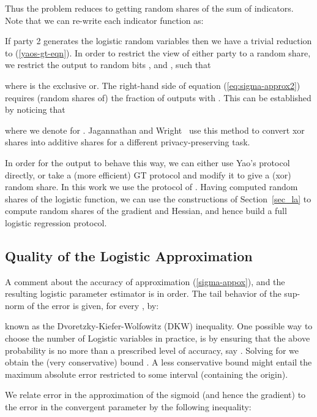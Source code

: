 \documentclass[11pt]{article}
\begin{document}
Thus the problem reduces to getting random shares of the sum of indicators.   Note that we can re-write each indicator function as:


\noindent If party 2 generates the logistic random variables then we have a trivial reduction to (\ref{yaos-gt-eqn}).  In order to restrict the view of either party to a random share, we restrict the output to random bits , and , such that

where  is the exclusive or. The right-hand side of equation (\ref{eq:sigma-approx2}) requires (random shares of) the fraction of outputs with . This can be established by noticing that

where we denote  for . Jagannathan and Wright~\cite{jagannathan} use this method to convert xor shares into additive shares for a different privacy-preserving task.

In order for the output to behave this way, we can either use Yao's protocol directly, or take a (more efficient) GT protocol and modify it to give a (xor) random share.  In this work we use the protocol of \citet{gt_proto}.  Having computed random shares of the logistic function, we can use the constructions of Section~\ref{sec_la} to compute random shares of the gradient and Hessian, and hence build a full logistic regression protocol.
















\subsection{Quality of the Logistic Approximation}\label{sec:ECDF}
A comment about the accuracy of approximation (\ref{sigma-appox}), and the resulting logistic parameter estimator is in order. The tail behavior of the sup-norm of the error is given, for every , by:

known as the Dvoretzky-Kiefer-Wolfowitz (DKW) inequality. One possible way to choose the number of Logistic variables  in practice, is by ensuring that the above probability is no more than a prescribed level of accuracy, say . Solving for  we obtain the (very conservative) bound . A less conservative bound might entail the maximum absolute error restricted to some interval (containing the origin). 

We relate error in the approximation of the sigmoid (and hence the gradient) to the error in the convergent parameter by the following inequality:
\end{document}
